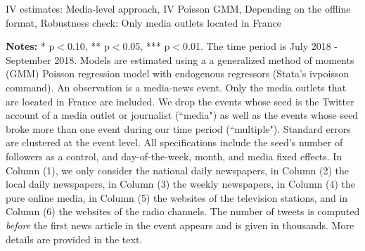 \clearpage
\pagebreak
\begin{table}
\caption{IV estimates: Media-level approach, IV Poisson GMM, Depending on the offline format, Robustness check: Only media outlets located in France}
\begin{center}
	
\end{center}
\begin{spacing}{0.5}
	{\fns \textbf{Notes:} * p$<$0.10, ** p$<$0.05, *** p$<$0.01. The time period is July 2018 - September 2018. Models are estimated using a a generalized method of moments (GMM) Poisson regression model with endogenous regressors (Stata's ivpoisson command). An observation is a media-news event. Only the media outlets that are located in France are included. We drop the events whose seed is the Twitter account of a media outlet or journalist (``media") as well as the events whose seed broke more than one event during our time period (``multiple"). Standard errors are clustered at the event level. All specifications include the seed's number of followers as a control, and day-of-the-week, month, and media fixed effects.  In Column (1), we only consider the national daily newspapers, in Column (2) the local daily newspapers, in Column (3) the weekly newspapers, in Column (4) the pure online media, in Column (5) the websites of the television stations, and in Column (6) the websites of the radio channels.	The number of tweets is computed \textit{before} the first news article in the event appears and is given in thousands. More details are provided in the text.}
\end{spacing}
\label{Tab:regression_media_IV_Poisson_GMM__RFrench}
\end{table} 


